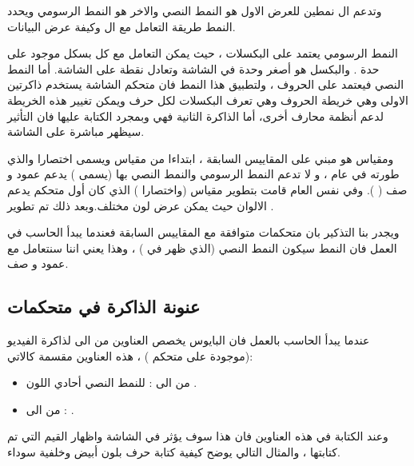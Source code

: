 \documentclass[document.tex]{subfiles}
\begin{document}
وتدعم ال  نمطين للعرض الاول هو النمط النصي  والاخر هو النمط الرسومي  ويحدد النمط طريقة التعامل مع ال  وكيفة عرض البيانات.

النمط الرسومي  يعتمد على البكسلات ، حيث يمكن التعامل مع كل بسكل موجود على حدة . والبكسل هو أصغر وحدة في الشاشة وتعادل نقطة على الشاشة. أما النمط النصي  فيعتمد على الحروف  ، ولتطبيق هذا النمط فان متحكم الشاشة  يستخدم ذاكرتين  الاولى وهي خريطة الحروف  وهي تعرف البكسلات لكل حرف ويمكن تغيير هذه الخريطة لدعم أنظمة محارف أخرى، أما الذاكرة الثانية فهي وبمجرد الكتابة عليها فان التأثير سيظهر مباشرة على الشاشة.

ومقياس  هو مبني على المقاييس السابقة ، ابتداءا من مقياس  ويسمى اختصارا  والذي طورته  في عام  ، و  لا تدعم النمط الرسومي والنمط النصي بها (يسمى ) يدعم  عمود و  صف ( ). وفي نفس العام قامت  بتطوير مقياس  (واختصارا ) الذي كان أول متحكم يدعم الالوان حيث يمكن عرض  لون مختلف.وبعد ذلك تم تطوير .

ويجدر بنا التذكير بان متحكمات  متوافقة مع المقاييس السابقة  فعندما يبدأ الحاسب في العمل فان النمط سيكون النمط النصي  (الذي ظهر في ) ، وهذا يعني اننا سنتعامل مع  عمود و  صف.


\subsection{عنونة الذاكرة في متحكمات }

عندما يبدأ الحاسب بالعمل فان البايوس يخصص العناوين من  الى  لذاكرة الفيديو  (موجودة على متحكم ) ، هذه العناوين مقسمة كالاتي:

\begin{itemize}
\item من  الى : للنمط النصي أحادي اللون .
\item من  الى : .
\end{itemize}

وعند الكتابة في هذه العناوين فان هذا سوف يؤثر في الشاشة واظهار القيم التي تم كتابتها ، والمثال التالي يوضح كيفية كتابة حرف  بلون أبيض وخلفية سوداء.
\end{document}
